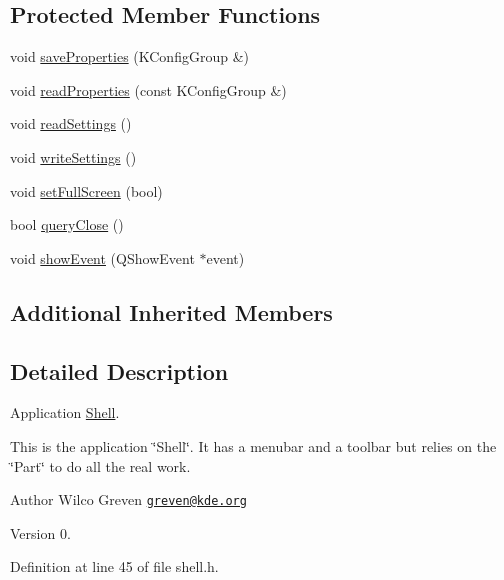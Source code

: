 \subsection*{Protected Member Functions}
\begin{DoxyCompactItemize}
\item 
void \hyperlink{classShell_a254d2b914100085489b8f967c9c1fb2f}{save\+Properties} (K\+Config\+Group \&)
\item 
void \hyperlink{classShell_afb988ebfb213d431cc21f2e1ec10735d}{read\+Properties} (const K\+Config\+Group \&)
\item 
void \hyperlink{classShell_a34428d8cacb14d2f8a507e63076a319d}{read\+Settings} ()
\item 
void \hyperlink{classShell_a95fbb886102b4b1b16b63b9719fcb19b}{write\+Settings} ()
\item 
void \hyperlink{classShell_a8c1c9763fce4e6316ceac51d3184bf43}{set\+Full\+Screen} (bool)
\item 
bool \hyperlink{classShell_a91c67c1f178630000a95f0c0e3f4e8f6}{query\+Close} ()
\item 
void \hyperlink{classShell_ad8e5ea98f2f35b313175f3b306acb598}{show\+Event} (Q\+Show\+Event $\ast$event)
\end{DoxyCompactItemize}
\subsection*{Additional Inherited Members}


\subsection{Detailed Description}
Application \hyperlink{classShell}{Shell}. 

This is the application \char`\"{}\+Shell\char`\"{}. It has a menubar and a toolbar but relies on the \char`\"{}\+Part\char`\"{} to do all the real work.

\begin{DoxyAuthor}{Author}
Wilco Greven \href{mailto:greven@kde.org}{\tt greven@kde.\+org} 
\end{DoxyAuthor}
\begin{DoxyVersion}{Version}
0. 
\end{DoxyVersion}


Definition at line 45 of file shell.\+h.



